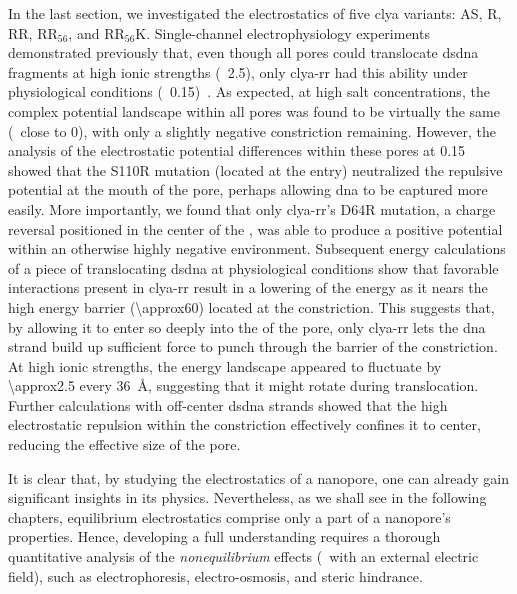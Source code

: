In the last section, we investigated the electrostatics of five \gls{clya} variants: AS, R, RR, RR$_{56}$, and
RR$_{56}$K. Single-channel electrophysiology experiments demonstrated previously that, even though all pores
could translocate \gls{dsdna} fragments at high ionic strengths (\eg~\SI{2.5}{\Molar}), only \gls{clya-rr} had
this ability under physiological conditions (\eg~\SI{0.15}{\Molar})~\cite{Franceschini-2016}. As expected, at
high salt concentrations, the complex potential landscape within all pores was found to be virtually the same
(\ie~close to 0), with only a slightly negative constriction remaining. However, the analysis of the
electrostatic potential differences within these pores at \SI{0.15}{\Molar} showed that the S110R mutation
(located at the \cisi{} entry) neutralized the repulsive potential at the mouth of the pore, perhaps allowing
\gls{dna} to be captured more easily. More importantly, we found that only \gls{clya-rr}'s D64R mutation, a
charge reversal positioned in the center of the \lumen{}, was able to produce a positive potential within an
otherwise highly negative environment. Subsequent energy calculations of a piece of translocating \gls{dsdna}
at physiological conditions show that favorable interactions present in \gls{clya-rr} result in a lowering of
the energy as it nears the high energy barrier (\SI{\approx60}{\kT}) located at the constriction. This
suggests that, by allowing it to enter so deeply into the \lumen{} of the pore, only \gls{clya-rr} lets the
\gls{dna} strand build up sufficient force to punch through the barrier of the constriction. At high ionic
strengths, the energy landscape appeared to fluctuate by \SI{\approx2.5}{\kT} every \SI{36}{\angstrom},
suggesting that it might rotate during translocation. Further calculations with off-center \gls{dsdna} strands
showed that the high electrostatic repulsion within the constriction effectively confines it to center,
reducing the effective size of the pore.

It is clear that, by studying the electrostatics of a nanopore, one can already gain significant insights in
its physics. Nevertheless, as we shall see in the following chapters, equilibrium electrostatics comprise only
a part of a nanopore's properties. Hence, developing a full understanding requires a thorough quantitative
analysis of the \emph{nonequilibrium} effects (\ie~with an external electric field), such as electrophoresis,
electro-osmosis, and steric hindrance.



\cleardoublepage

